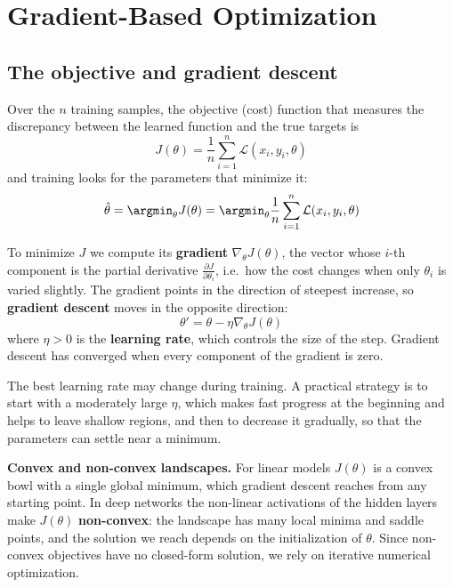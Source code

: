 \section{Gradient-Based Optimization}
\label{sec:optimization}
\subsection{The objective and gradient descent}
Over the $n$ training samples, the objective (cost) function that measures the
discrepancy between the learned function and the true targets is
\begin{equation}
    J(\theta) = \frac{1}{n} \sum_{i=1}^n \mathcal{L}(x_i, y_i, \theta)
\end{equation}
and training looks for the parameters that minimize it:
\begin{equation}
    \hat{\theta} = \argmin_{\theta} J(\theta) = \argmin_{\theta} \frac{1}{n}
    \sum_{i=1}^n \mathcal{L}(x_i, y_i, \theta)
\end{equation}

To minimize $J$ we compute its \textbf{gradient} $\nabla_\theta J(\theta)$, the
vector whose $i$-th component is the partial derivative
$\frac{\partial J}{\partial \theta_i}$, i.e.\ how the cost changes when only
$\theta_i$ is varied slightly. The gradient points in the direction of steepest
increase, so \textbf{gradient descent} moves in the opposite direction:
\begin{equation}
    \theta' = \theta - \eta \nabla_\theta J(\theta)
\end{equation}
where $\eta > 0$ is the \textbf{learning rate}, which controls the size of the step.
Gradient descent has converged when every component of the gradient is zero.

The best learning rate may change during training. A practical strategy is to start
with a moderately large $\eta$, which makes fast progress at the beginning and
helps to leave shallow regions, and then to decrease it gradually, so that the
parameters can settle near a minimum.

\begin{note}
    \textbf{Convex and non-convex landscapes.} For linear models $J(\theta)$ is a
    convex bowl with a single global minimum, which gradient descent reaches from
    any starting point. In deep networks the non-linear activations of the hidden
    layers make $J(\theta)$ \textbf{non-convex}: the landscape has many local minima
    and saddle points, and the solution we reach depends on the initialization of
    $\theta$. Since non-convex objectives have no closed-form solution, we rely on
    iterative numerical optimization.
\end{note}

